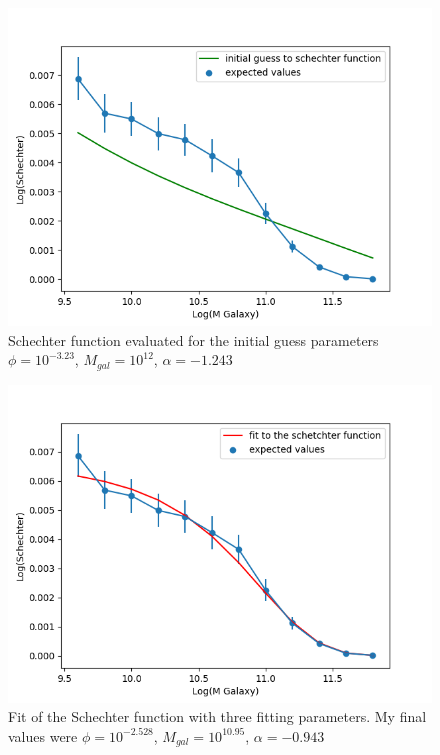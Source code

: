 \documentclass[12pt]{article}
\begin{document}
\begin{figure}
    \centering
    \includegraphics{HW2_schecterfit_initial.png}
    \caption{Schechter function evaluated for the initial guess parameters $\phi = 10^{-3.23}$, $M_{gal} = 10^{12}$, $\alpha = -1.243$}
    \label{fig:initial}
\end{figure}{}
\begin{figure}
    \centering
    \includegraphics{HW2_schecterfit.png}
    \caption{Fit of the Schechter function with three fitting parameters. My final values were $\phi = 10^{-2.528}$, $M_{gal} = 10^{10.95}$, $\alpha = -0.943$}
    \label{fig:final}
\end{figure}{}
\end{document}
